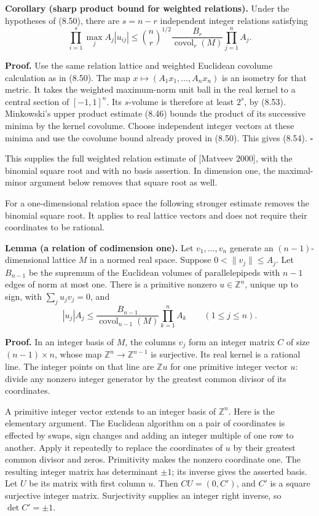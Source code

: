 \documentclass[
  11pt,
  a4paper,
]{article}
\begin{document}
\textbf{Corollary (sharp product bound for weighted relations).} Under
the hypotheses of (8.50), there are \(s=n-r\) independent integer
relations satisfying \[
\prod_{i=1}^{s}\max_j A_j|u_{ij}|
\le
\binom nr^{1/2}
\frac{B_r}{\operatorname{covol}_r(M)}
\prod_{j=1}^n A_j.
\tag{8.54}
\]

\textbf{Proof.} Use the same relation lattice and weighted Euclidean
covolume calculation as in (8.50). The map
\(x\mapsto(A_1x_1,\ldots,A_nx_n)\) is an isometry for that metric. It
takes the weighted maximum-norm unit ball in the real kernel to a
central section of \([-1,1]^n\). Its \(s\)-volume is therefore at least
\(2^s\), by (8.53). Minkowski's upper product estimate (8.46) bounds the
product of its successive minima by the kernel covolume. Choose
independent integer vectors at these minima and use the covolume bound
already proved in (8.50). This gives (8.54). \(\square\)

This supplies the full weighted relation estimate of {[}Matveev 2000{]},
with the binomial square root and with no basis assertion. In dimension
one, the maximal-minor argument below removes that square root as well.

For a one-dimensional relation space the following stronger estimate
removes the binomial square root. It applies to real lattice vectors and
does not require their coordinates to be rational.

\textbf{Lemma (a relation of codimension one).} Let \(v_1,\ldots,v_n\)
generate an \((n-1)\)-dimensional lattice \(M\) in a normed real space.
Suppose \(0<\|v_j\|\le A_j\). Let \(B_{n-1}\) be the supremum of the
Euclidean volumes of parallelepipeds with \(n-1\) edges of norm at most
one. There is a primitive nonzero \(u\in\mathbb Z^n\), unique up to
sign, with \(\sum_j u_jv_j=0\), and \[
|u_j|A_j\le
\frac{B_{n-1}}{\operatorname{covol}_{n-1}(M)}
\prod_{k=1}^n A_k
\qquad(1\le j\le n).
\tag{8.55}
\]

\textbf{Proof.} In an integer basis of \(M\), the columns \(v_j\) form
an integer matrix \(C\) of size \((n-1)\times n\), whose map
\(\mathbb Z^n\to\mathbb Z^{n-1}\) is surjective. Its real kernel is a
rational line. The integer points on that line are \(\mathbb Z u\) for
one primitive integer vector \(u\): divide any nonzero integer generator
by the greatest common divisor of its coordinates.

A primitive integer vector extends to an integer basis of
\(\mathbb Z^n\). Here is the elementary argument. The Euclidean
algorithm on a pair of coordinates is effected by swaps, sign changes
and adding an integer multiple of one row to another. Apply it
repeatedly to replace the coordinates of \(u\) by their greatest common
divisor and zeros. Primitivity makes the nonzero coordinate one. The
resulting integer matrix has determinant \(\pm1\); its inverse gives the
asserted basis. Let \(U\) be its matrix with first column \(u\). Then
\(CU=(0,C')\), and \(C'\) is a square surjective integer matrix.
Surjectivity supplies an integer right inverse, so \(\det C'=\pm1\).
\end{document}
